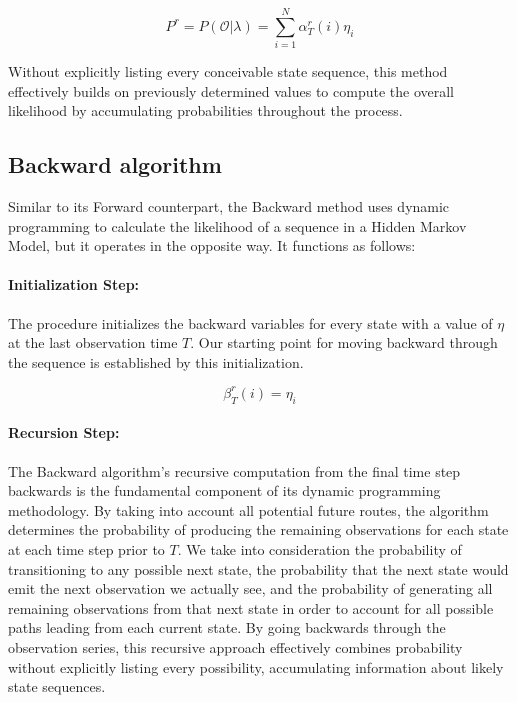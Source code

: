 \documentclass{article}
\begin{document}
\begin{equation}
	P^r = P(\mathcal{O}|\lambda) = \sum^N_{i=1}\alpha^r_T(i)\eta_i
\end{equation}

Without explicitly listing every conceivable state sequence, this method effectively builds on previously determined values to compute the overall likelihood by accumulating probabilities throughout the process.


\subsection{Backward algorithm}

Similar to its Forward counterpart, the Backward method uses dynamic programming to calculate the likelihood of a sequence in a Hidden Markov Model, but it operates in the opposite way. It functions as follows:

\paragraph{Initialization Step:} The procedure initializes the backward variables for every state with a value of $\eta$ at the last observation time $T$. Our starting point for moving backward through the sequence is established by this initialization.

\begin{equation}
	\beta^r_T(i) = \eta_i
\end{equation}


\paragraph{Recursion Step:} The Backward algorithm's recursive computation from the final time step backwards is the fundamental component of its dynamic programming methodology. By taking into account all potential future routes, the algorithm determines the probability of producing the remaining observations for each state at each time step prior to $T$. We take into consideration the probability of transitioning to any possible next state, the probability that the next state would emit the next observation we actually see, and the probability of generating all remaining observations from that next state in order to account for all possible paths leading from each current state. By going backwards through the observation series, this recursive approach effectively combines probability without explicitly listing every possibility, accumulating information about likely state sequences.
\end{document}
